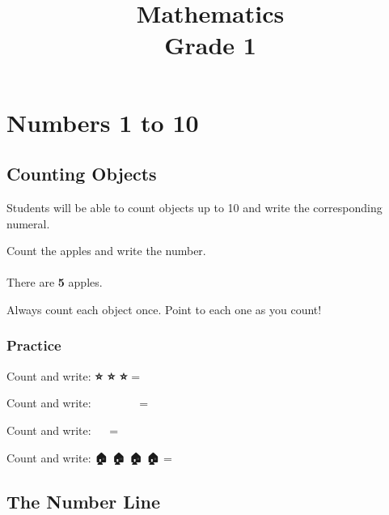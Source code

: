 \documentclass{math_textbook}
\begin{document}
\frontmatter
\title{\Huge\bfseries\color{GradeMain}Mathematics\\[6pt]\large Grade 1}
\author{}
\date{}
\maketitle
\tableofcontents

\mainmatter

\chapter{Numbers 1 to 10}

\section{Counting Objects}

\begin{learningobjective}
Students will be able to count objects up to 10 and write the corresponding numeral.
\end{learningobjective}

\begin{workedexample}
Count the apples and write the number.\\[8pt]
\textbf{🍎 🍎 🍎 🍎 🍎}\\[6pt]
There are \textbf{5} apples.
\end{workedexample}

\begin{remember}
Always count each object once. Point to each one as you count!
\end{remember}

\subsection*{Practice}
\begin{practicegrid}
  \item Count and write: \textbf{⭐ ⭐ ⭐} = \blank
  \item Count and write: \textbf{🌸 🌸 🌸 🌸 🌸 🌸} = \blank
  \item Count and write: \textbf{🐶 🐶} = \blank
  \item Count and write: \textbf{🏠 🏠 🏠 🏠} = \blank
\end{practicegrid}

\section{The Number Line}
\end{document}
